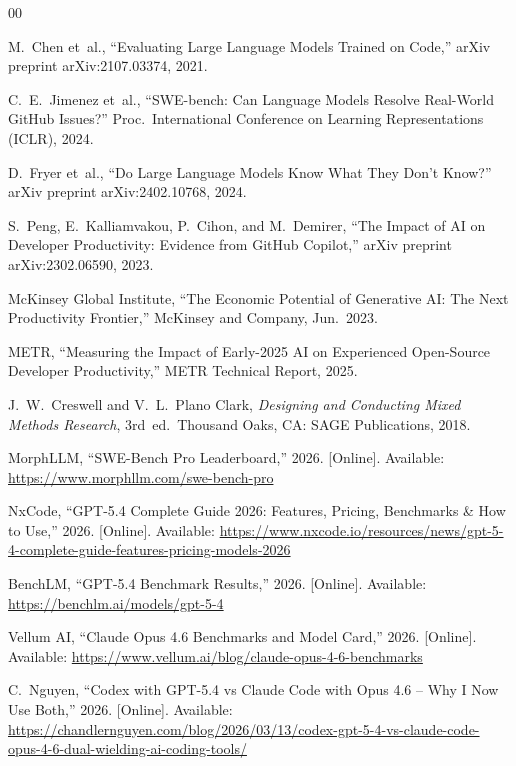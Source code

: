 \documentclass[conference]{IEEEtran}
\begin{document}
\begin{thebibliography}{00}
\setlength{\itemsep}{-2pt}
\sloppy

M.~Chen et~al., ``Evaluating Large Language Models Trained on Code,'' arXiv preprint arXiv:2107.03374, 2021.

C.~E.~Jimenez et~al., ``SWE-bench: Can Language Models Resolve Real-World GitHub Issues?'' Proc.\ International Conference on Learning Representations (ICLR), 2024.

D.~Fryer et~al., ``Do Large Language Models Know What They Don't Know?'' arXiv preprint arXiv:2402.10768, 2024.

S.~Peng, E.~Kalliamvakou, P.~Cihon, and M.~Demirer, ``The Impact of AI on Developer Productivity: Evidence from GitHub Copilot,'' arXiv preprint arXiv:2302.06590, 2023.

McKinsey Global Institute, ``The Economic Potential of Generative AI: The Next Productivity Frontier,'' McKinsey and Company, Jun.\ 2023.

METR, ``Measuring the Impact of Early-2025 AI on Experienced Open-Source Developer Productivity,'' METR Technical Report, 2025.

J.~W.~Creswell and V.~L.~Plano Clark, \textit{Designing and Conducting Mixed Methods Research}, 3rd~ed.\ Thousand Oaks, CA: SAGE Publications, 2018.

MorphLLM, ``SWE-Bench Pro Leaderboard,'' 2026. [Online]. Available: \url{https://www.morphllm.com/swe-bench-pro}

NxCode, ``GPT-5.4 Complete Guide 2026: Features, Pricing, Benchmarks \& How to Use,'' 2026. [Online]. Available: \url{https://www.nxcode.io/resources/news/gpt-5-4-complete-guide-features-pricing-models-2026}

BenchLM, ``GPT-5.4 Benchmark Results,'' 2026. [Online]. Available: \url{https://benchlm.ai/models/gpt-5-4}

Vellum AI, ``Claude Opus 4.6 Benchmarks and Model Card,'' 2026. [Online]. Available: \url{https://www.vellum.ai/blog/claude-opus-4-6-benchmarks}

C.~Nguyen, ``Codex with GPT-5.4 vs Claude Code with Opus 4.6 -- Why I Now Use Both,'' 2026. [Online]. Available: \url{https://chandlernguyen.com/blog/2026/03/13/codex-gpt-5-4-vs-claude-code-opus-4-6-dual-wielding-ai-coding-tools/}


\end{thebibliography}
\end{document}

